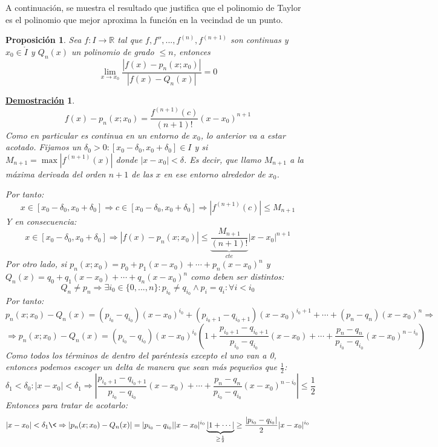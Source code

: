 \documentclass[10pt,a4paper,openright]{book}
\theoremstyle{break}
\newtheorem{prop}{Proposición}[chapter]
\newtheorem*{demo}{\underline{Demostración}}
\begin{document}
A continuación, se muestra el resultado que justifica que el polinomio de Taylor es el polinomio que mejor aproxima la función en la vecindad de un punto.

\begin{prop}
Sea $f: I\rightarrow\mathbb R$ tal que $f, f'', ..., f^{(n)}, f^{(n+1)}$ son continuas y $x_0\in \mathring{I}$ y $Q_n(x)$ un polinomio de grado $\leq n$, entonces
\[
\lim_{x\rightarrow x_0}\frac{|f(x)-p_n(x;x_0)|}{|f(x)-Q_n(x)|}=0
\]
\end{prop}
\begin{demo}
$$f(x)-p_n(x;x_0)=\frac{f^{(n+1)}(c)}{(n+1)!}(x-x_0)^{n+1}$$
Como en particular es continua en un entorno de $x_0$, lo anterior va a estar acotado. Fijamos un $\delta_0>0 : [x_0-\delta_0, x_0+\delta_0]\in I$ y si $M_{n+1}=\max |f^{(n+1)}(x)|$ donde $|x-x_0|<\delta$. Es decir, que llamo $M_{n+1}$ a la máxima derivada del orden $n+1$ de las $x$ en ese entorno alrededor de $x_0$. 

Por tanto:
$$x\in [x_0-\delta_0, x_0+\delta_0]\Rightarrow c\in [x_0-\delta_0, x_0+\delta_0] \Rightarrow |f^{(n+1)}(c)|\leq M_{n+1}$$
Y en consecuencia:
$$x\in [x_0-\delta_0, x_0+\delta_0]\Rightarrow |f(x)-p_n(x;x_0)|\leq \underbrace{\frac{M_{n+1}}{(n+1)!}}_{cte}|x-x_0|^{n+1}$$
Por otro lado, si $p_n(x;x_0)=p_0+p_1(x-x_0)+\cdots +p_n(x-x_0)^n$ y $Q_n(x)=q_0+q_1(x-x_0)+\cdots +q_n(x-x_0)^n$ como deben ser distintos:
$$Q_n\neq p_n\Rightarrow \exists i_0\in \{0, ..., n\}: p_{i_0}\neq q_{i_0}\wedge p_i=q_i:\forall i < i_0$$
Por tanto:
$$p_n(x;x_0)-Q_n(x)=(p_{i_0}-q_{i_0})(x-x_0)^{i_0}+(p_{i_0+1}-q_{i_0+1})(x-x_0)^{i_0+1}+\cdots + (p_n-q_n)(x-x_0)^{n}\Rightarrow $$
$$\Rightarrow p_n(x;x_0)-Q_n(x)=(p_{i_0}-q_{i_0})(x-x_0)^{i_0}\left( 1+ \frac{p_{i_0+1}-q_{i_0+1}}{p_{i_0}-q_{i_0}}(x-x_0)+\cdots + \frac{p_n-q_n}{p_{i_0}-q_{i_0}}(x-x_0)^{n-i_0}\right)$$
Como todos los términos de dentro del paréntesis excepto el uno van a 0, entonces podemos escoger un delta de manera que sean más pequeños que $\frac{1}{2}$:
$$\delta_1< \delta_0: |x-x_0|<\delta_1\Rightarrow \left| \frac{p_{i_0+1}-q_{i_0+1}}{p_{i_0}-q_{i_0}}(x-x_0)+\cdots + \frac{p_n-q_n}{p_{i_0}-q_{i_0}}(x-x_0)^{n-i_0}\right|\leq \frac{1}{2}$$
Entonces para tratar de acotarlo:
$$|x-x_0|<\delta_1\<\Rightarrow|p_n(x;x_0)-Q_n(x)|=|p_{i_0}-q_{i_0}||x-x_0|^{i_0}\underbrace{\left| 1 + \cdots \right|}_{\geq \frac{1}{2}}\geq \frac{|p_{i_0}-q_{i_0}|}{2}|x-x_0|^{i_0}$$


\end{demo}
\end{document}
